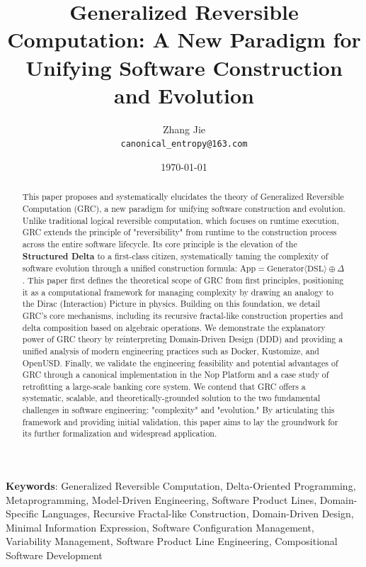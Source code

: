 \documentclass[11pt]{article}
\begin{document}
\title{\textbf{Generalized Reversible Computation: A New Paradigm for Unifying Software Construction and Evolution}}
\author{Zhang Jie \\ \texttt{canonical\_entropy@163.com}}
\date{\today}

\maketitle

\begin{abstract}
This paper proposes and systematically elucidates the theory of Generalized Reversible Computation (GRC), a new paradigm for unifying software construction and evolution. Unlike traditional logical reversible computation, which focuses on runtime execution, GRC extends the principle of "reversibility" from runtime to the construction process across the entire software lifecycle. Its core principle is the elevation of the \textbf{Structured Delta} to a first-class citizen, systematically taming the complexity of software evolution through a unified construction formula: $\text{App} = \text{Generator}\langle\text{DSL}\rangle \oplus \Delta$. This paper first defines the theoretical scope of GRC from first principles, positioning it as a computational framework for managing complexity by drawing an analogy to the Dirac (Interaction) Picture in physics. Building on this foundation, we detail GRC's core mechanisms, including its recursive fractal-like construction properties and delta composition based on algebraic operations. We demonstrate the explanatory power of GRC theory by reinterpreting Domain-Driven Design (DDD) and providing a unified analysis of modern engineering practices such as Docker, Kustomize, and OpenUSD. Finally, we validate the engineering feasibility and potential advantages of GRC through a canonical implementation in the Nop Platform and a case study of retrofitting a large-scale banking core system. We contend that GRC offers a systematic, scalable, and theoretically-grounded solution to the two fundamental challenges in software engineering: "complexity" and "evolution." By articulating this framework and providing initial validation, this paper aims to lay the groundwork for its further formalization and widespread application.
\end{abstract}

\vspace{1em}
\noindent\textbf{Keywords}: Generalized Reversible Computation, Delta-Oriented Programming, Metaprogramming, Model-Driven Engineering, Software Product Lines, Domain-Specific Languages, Recursive Fractal-like Construction, Domain-Driven Design, Minimal Information Expression, Software Configuration Management, Variability Management, Software Product Line Engineering, Compositional Software Development
\end{document}
